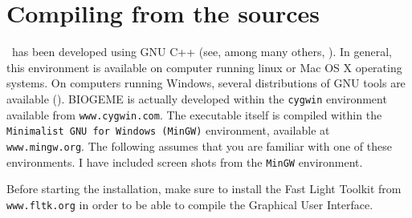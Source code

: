 \documentclass[12pt]{memoir}
\begin{document}

\section{Compiling from the sources}
\label{sec:compiling}

\BIOGEME\ has been developed using  GNU C++ (see, among many others,
\cite{Swan99}). In general, this environment is available on computer
running linux or Mac OS X operating systems. On computers running
Windows, several distributions of GNU tools are available (\cite{HageWeisZare01}). BIOGEME
is actually developed within the \texttt{cygwin} environment available
from \texttt{www.cygwin.com}. The
executable itself is compiled within the \texttt{Minimalist GNU for
Windows (MinGW)} environment, available at
\texttt{www.mingw.org}. The following
assumes that you are familiar with one of these environments. I have
included screen shots from the \texttt{MinGW} environment.

Before starting the installation, make sure to  install the Fast Light
Toolkit from \texttt{www.fltk.org} in order to be able
to compile the Graphical User Interface.
\end{document}
